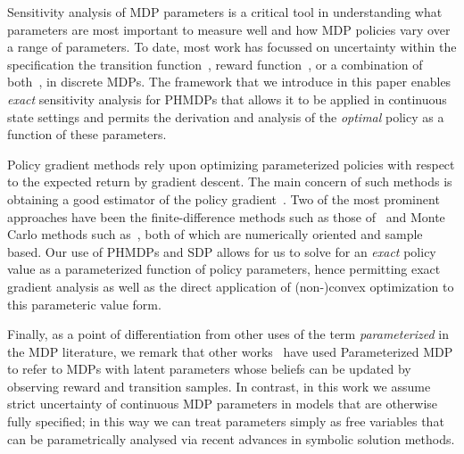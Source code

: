 Sensitivity analysis of MDP parameters is a critical tool in understanding what parameters are most important to measure well and how MDP policies vary over a range of parameters.  To date, most work has focussed on uncertainty within the specification the transition function~\parencite{Kalyanasundaram_AJC_2004}, reward function~\parencite{Tan_JAP_2011, Hopp_JOTA_1988}, or a combination of both~\parencite{Givan_AI_2000}, in discrete MDPs. The framework that we introduce in this paper enables \textit{exact} sensitivity analysis
for PHMDPs that allows it to be applied in continuous state settings and permits the derivation and analysis of the \emph{optimal} policy as a
function of these parameters.

Policy gradient methods rely upon optimizing parameterized policies with respect to the expected return by gradient descent. The main
concern of such methods is obtaining a good estimator of the policy gradient~\parencite{Peters_IRS_2006}. Two of the most prominent
approaches have been the finite-difference methods such as those of~\parencite{Ng_UAI_2000} and Monte Carlo methods such as~\parencite{Sutton_NIPS_1999,Baxter_ISCAS_2000}, both of which are numerically oriented and sample based. Our use of PHMDPs and SDP allows for us to solve for an \emph{exact} policy value as a parameterized function of policy parameters, hence permitting exact gradient analysis as well as the direct application of (non-)convex optimization to this parameteric value form.

Finally, as a point of differentiation from other uses of the term \emph{parameterized} in the MDP literature, we remark that other works~\parencite{Duff_UMA_2002,Dearden_UAI_1999,Gopalan_COLT_2015} have used Parameterized MDP to refer to MDPs with latent parameters whose
beliefs can be updated by observing reward and transition samples. In contrast, in this work we assume strict uncertainty of continuous MDP
parameters in models that are otherwise fully specified; in this way we can treat parameters simply as free variables that can be parametrically analysed via recent advances in symbolic solution methods.


